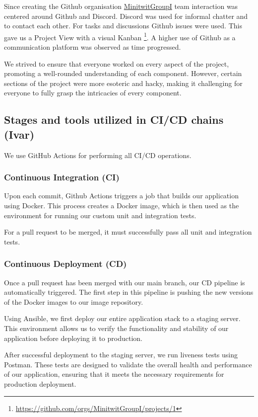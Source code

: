 \documentclass{article}
\begin{document}
Since creating the Github organisation \href{https://github.com/MinitwitGroupI/}{MinitwitGroupI} team interaction was centered around Github and Discord. Discord was used for informal chatter and to contact each other. For tasks and discussions Github issues were used. This gave us a Project View with a visual Kanban \footnote{\url{https://github.com/orgs/MinitwitGroupI/projects/1}}. A higher use of Github as a communication platform was observed as time progressed. 

We strived to ensure that everyone worked on every aspect of the project, promoting a well-rounded understanding of each component. However, certain sections of the project were more esoteric and hacky, making it challenging for everyone to fully grasp the intricacies of every component. 


\subsection{Stages and tools utilized in CI/CD chains (Ivar)}

We use GitHub Actions for performing all CI/CD operations.

\subsubsection{Continuous Integration (CI)}

Upon each commit, Github Actions triggers a job that builds our application using Docker. This process creates a Docker image, which is then used as the environment for running our custom unit and integration tests.

For a pull request to be merged, it must successfully pass all unit and integration tests.

\subsubsection{Continuous Deployment (CD)}

Once a pull request has been merged with our main branch, our CD pipeline is automatically triggered. 
The first step in this pipeline is pushing the new versions of the Docker images to our image repository. 

Using Ansible, we first deploy our entire application stack to a staging server. This environment allows us to verify the functionality and stability of our application before deploying it to production.

After successful deployment to the staging server, we run liveness tests using Postman. These tests are designed to validate the overall health and performance of our application, ensuring that it meets the necessary requirements for production deployment.
\end{document}
